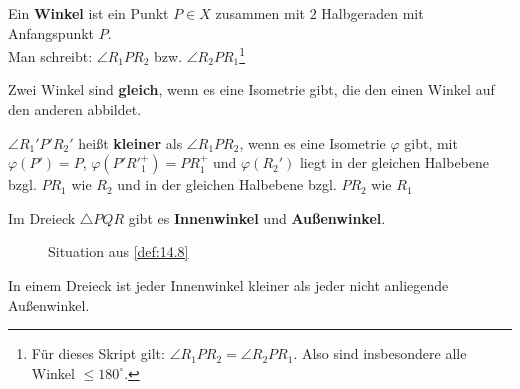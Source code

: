 \begin{definition}\label{def:14.8}%
    \begin{defenum}
        \item \label{def:14.8a} Ein \textbf{Winkel} ist ein Punkt $P \in X$ 
              zusammen mit $2$ Halbgeraden mit Anfangspunkt $P$.\\
              Man schreibt: $\angle R_1 P R_2$ bzw. $\angle R_2 P R_1$\footnote{Für dieses Skript gilt: $\angle R_1 P R_2 = \angle R_2 P R_1$. Also sind insbesondere alle Winkel $ \leq 180^\circ$.}
        \item Zwei Winkel sind \textbf{gleich}, wenn es eine Isometrie gibt, 
              die den einen Winkel auf den anderen abbildet.
        \item \label{def:14.8c} $\angle R_1' P' R_2'$ heißt \textbf{kleiner} als
              $\angle R_1 P R_2$, wenn es eine Isometrie $\varphi$
              gibt, mit $\varphi(P') = P$, $\varphi(P'R'^{+}_{1}) = PR_{1}^{+}$
              und $\varphi(R_2')$ liegt in der gleichen Halbebene 
              bzgl. $PR_1$ wie $R_2$ und in der gleichen Halbebene
              bzgl. $PR_2$ wie $R_1$
        \item \label{def:14.8d} Im Dreieck $\triangle PQR$ gibt es \textbf{Innenwinkel} und
              \textbf{Außenwinkel}.
    \end{defenum}
\end{definition}

\begin{figure}[ht]
    \centering
    \label{fig:def.14.8.0}
    \caption{Situation aus \cref{def:14.8}}
\end{figure}

\begin{bemerkung}\label{bem:14.9}%
    In einem Dreieck ist jeder Innenwinkel kleiner als jeder nicht 
    anliegende Außenwinkel.
\end{bemerkung}

